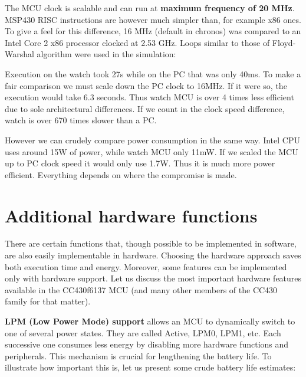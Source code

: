 The MCU clock is scalable and can run at {\bf maximum frequency of 20 MHz}.
MSP430 RISC instructions are however much simpler than, for example
x86 ones. To give a feel for this difference, 16 MHz (default in
chronos) was compared to an Intel Core 2 x86 processor clocked at 2.53
GHz. Loops similar to those of Floyd-Warshal algorithm were used in the
simulation:

% 
% 

Execution on the watch took 27s while on the PC that was only 40ms.
To make a fair comparison we must scale down the PC clock to 16MHz. If
it were so, the execution would take 6.3 seconds. Thus watch MCU
is over 4 times less efficient due to sole architectural differences.
If we count in the clock speed difference, watch is over 670 times
slower than a PC.

However we can crudely compare power consumption in the same way.
Intel CPU uses around 15W of power, while watch MCU only 11mW. If we
scaled the MCU up to PC clock speed it would only use 1.7W. Thus it is
much more power efficient. Everything depends on where the compromise
is made.

\section{Additional hardware functions}

There are certain functions that, though possible to be implemented in
software, are also easily implementable in hardware. Choosing the
hardware approach saves both execution time and energy. Moreover, some
features can be implemented only with hardware support. Let us discuss
the most important hardware features available in the CC430f6137 MCU
(and many other members of the CC430 family for that matter).

{\bf LPM (Low Power Mode) support} allows an MCU to dynamically switch to
one of several power states.  They are called Active, LPM0, LPM1, etc.
Each successive one consumes less energy by disabling more hardware
functions and peripherals. This mechanism is crucial for lengthening
the battery life. To illustrate how important this is, let us present
some crude battery life estimates:

